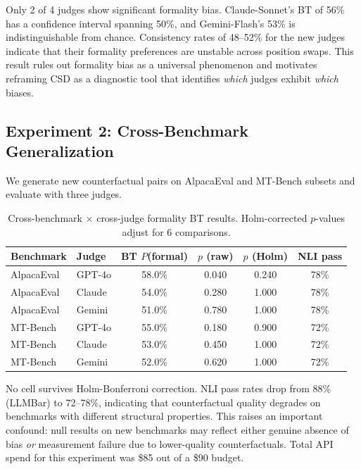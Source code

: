 \documentclass[11pt,a4paper]{article}
\begin{document}
Only 2 of 4 judges show significant formality bias. Claude-Sonnet's BT of 56\% has a confidence interval spanning 50\%, and Gemini-Flash's 53\% is indistinguishable from chance. Consistency rates of 48--52\% for the new judges indicate that their formality preferences are unstable across position swaps. This result rules out formality bias as a universal phenomenon and motivates reframing CSD as a diagnostic tool that identifies \emph{which} judges exhibit \emph{which} biases.

\subsection{Experiment 2: Cross-Benchmark Generalization}
\label{sec:cross-bench}

We generate new counterfactual pairs on AlpacaEval and MT-Bench subsets and evaluate with three judges.

\begin{table}[h]
\centering
\caption{Cross-benchmark $\times$ cross-judge formality BT results. Holm-corrected $p$-values adjust for 6 comparisons.}
\label{tab:cross-bench}
\begin{tabular}{llcccc}
\toprule
\textbf{Benchmark} & \textbf{Judge} & \textbf{BT $P$(formal)} & \textbf{$p$ (raw)} & \textbf{$p$ (Holm)} & \textbf{NLI pass} \\
\midrule
AlpacaEval & GPT-4o & 58.0\% & 0.040 & 0.240 & 78\% \\
AlpacaEval & Claude & 54.0\% & 0.280 & 1.000 & 78\% \\
AlpacaEval & Gemini & 51.0\% & 0.780 & 1.000 & 78\% \\
MT-Bench & GPT-4o & 55.0\% & 0.180 & 0.900 & 72\% \\
MT-Bench & Claude & 53.0\% & 0.450 & 1.000 & 72\% \\
MT-Bench & Gemini & 52.0\% & 0.620 & 1.000 & 72\% \\
\bottomrule
\end{tabular}
\end{table}

No cell survives Holm-Bonferroni correction. NLI pass rates drop from 88\% (LLMBar) to 72--78\%, indicating that counterfactual quality degrades on benchmarks with different structural properties. This raises an important confound: null results on new benchmarks may reflect either genuine absence of bias \emph{or} measurement failure due to lower-quality counterfactuals. Total API spend for this experiment was \$85 out of a \$90 budget.
\end{document}
